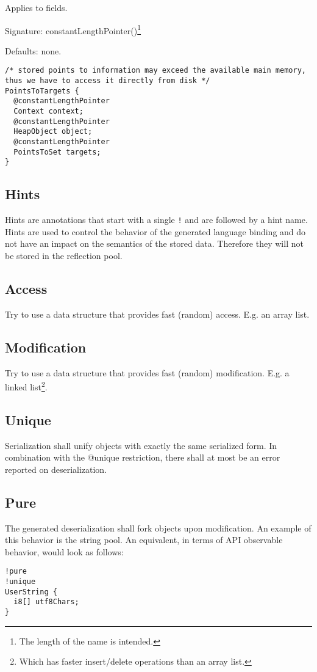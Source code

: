 Applies to fields.

Signature: constantLengthPointer()\footnote{The length of the name is intended.}

Defaults: none.

\begin{lstlisting}[label=constantLengthPointerExample,caption=Examples,language=skill]
/* stored points to information may exceed the available main memory, thus we have to access it directly from disk */
PointsToTargets {
  @constantLengthPointer
  Context context;
  @constantLengthPointer
  HeapObject object;
  @constantLengthPointer
  PointsToSet targets;
}
\end{lstlisting}




\subsection{Hints}
\label{hints}

Hints are annotations that start with a single \verb/!/ and are followed by a hint name. Hints are used to control the behavior of the generated language binding and do not have an impact on the semantics of the stored data. Therefore they will not be stored in the reflection pool.

\subsection*{Access}
Try to use a data structure that provides fast (random) access. E.g. an array list.

\subsection*{Modification}
Try to use a data structure that provides fast (random) modification. E.g. a linked list\footnote{Which has faster insert/delete operations than an array list.}.

\subsection*{Unique}
\label{hints:unique}
Serialization shall unify objects with exactly the same serialized form. In combination with the @unique restriction, there shall at most be an error reported on deserialization.


\subsection*{Pure}
\label{hints:pure}
The generated deserialization shall fork objects upon modification. An example of this behavior is the string pool. An equivalent, in terms of API observable behavior, would look as follows:
\begin{lstlisting}[label=prueExample,caption=User Strings,language=skill]
!pure
!unique
UserString {
  i8[] utf8Chars;
}
\end{lstlisting}



